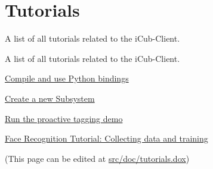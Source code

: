 \hypertarget{group__icubclient__tutorials}{}\section{Tutorials}
\label{group__icubclient__tutorials}


A list of all tutorials related to the i\+Cub-\/\+Client.  


A list of all tutorials related to the i\+Cub-\/\+Client. 


\begin{DoxyItemize}
\item \hyperlink{group__icubclient__bindings}{Compile and use Python bindings}
\item \hyperlink{group__icubclient__create__subsystem}{Create a new Subsystem}
\item \hyperlink{group__icubclient__tagging}{Run the proactive tagging demo}
\item \hyperlink{group__icubclient__facerecog}{Face Recognition Tutorial\+: Collecting data and training}
\end{DoxyItemize}

(This page can be edited at \hyperlink{tutorials_8dox}{src/doc/tutorials.\+dox}) 